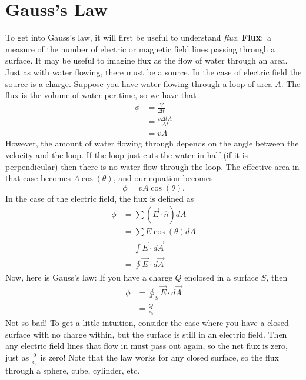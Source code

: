 \documentclass[nobib]{tufte-handout}
\newcommand{\defn}[2]{\noindent\textbf{#1}:\ #2}
\begin{document}
\section{Gauss's Law}
To get into Gauss's law, it will first be useful to understand \emph{flux}. 
\defn{Flux}{a measure of the number of electric or magnetic field lines 
passing through a surface.} 
It may be useful to imagine flux as the flow of water through an area. 
Just as with water flowing, there must be a source. In the case of electric field 
the source is a charge. Suppose you have water flowing through a loop of area $A$. 
The flux is the volume of water per time, so we have that 
\begin{align*}
    \phi &= \frac{V}{\Delta t} \\
    &= \frac{v \Delta t A}{\Delta t} \\
    &= vA
\end{align*}
However, the amount of water flowing through depends on the angle between the 
velocity and the loop. If the loop just cuts the water in half (if it is perpendicular)
then there is no water flow through the loop. The effective area in that case becomes 
$A \cos(\theta)$, and our equation becomes 
\[\phi = vA\cos(\theta).\]
In the case of the electric field, the flux is defined as
\begin{align*}
    \phi &= \sum (\vec{E} \cdot \hat{n}) dA \\
    &= \sum E\cos(\theta) dA \\
    &= \int \vec{E} \cdot d\vec{A} \\
    &= \oint \vec{E} \cdot d\vec{A}
\end{align*}
Now, here is Gauss's law: 
If you have a charge $Q$ enclosed in a surface $S$, 
then 
\begin{align*}
    \phi &= \oint_S \vec{E} \cdot d\vec{A} \\
    &= \frac{Q}{\epsilon_0}
\end{align*}
Not so bad! To get a little intuition, consider
the case where you have a closed surface with 
no charge within, but the surface is still in an
electric field. Then any electric field lines that 
flow in must pass out again, so the net flux is 
zero, just as $\frac{0}{\epsilon_0}$ is zero!
Note that the law works for any closed surface, so 
the flux through a sphere, cube, cylinder, etc. 
\end{document}
